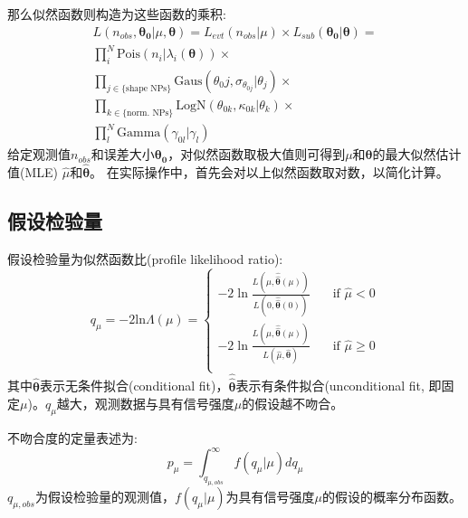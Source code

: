 那么似然函数则构造为这些函数的乘积:
\begin{equation}
\begin{aligned}
 L(n_{obs},\boldsymbol{\theta_0}|\mu,\boldsymbol{\theta})=L_{evt}(n_{obs}|\mu)\times L_{sub}(\boldsymbol{\theta_0}|\boldsymbol{\theta})=\\
 \prod_i^N\text{Pois}(n_i|\lambda_i(\boldsymbol{\theta}))\times \\
 \prod_{j\in\{\text{shape NPs}\}}\text{Gaus}(\theta_0j,\sigma_{\theta_{0j}}|\theta_j)\times \\
 \prod_{k\in\{\text{norm. NPs}\}}\text{LogN}(\theta_{0k},\kappa_{0k}|\theta_k)\times \\
 \prod_l^N\text{Gamma}(\gamma_{0l}|\gamma_l)
\end{aligned}
\end{equation}
给定观测值$n_{obs}$和误差大小$\boldsymbol{\theta_0}$，对似然函数取极大值则可得到$\mu$和$\boldsymbol{\theta}$的最大似然估计值(MLE) $\hat{\mu}$和$\hat{\boldsymbol{\theta}}$。
在实际操作中，首先会对以上似然函数取对数，以简化计算。

\subsection{假设检验量}
假设检验量为似然函数比(profile likelihood ratio):
\begin{equation}
\label{eq:test_statistic}
 q_\mu = -2\text{ln}\Lambda(\mu)=
  \begin{cases}
    -2 \ln \frac{L(\mu,\hat{\hat{\boldsymbol{\theta}}}(\mu))}{L(0,\hat{\hat{\boldsymbol{\theta}}}(0))} & \quad \text{if $\hat\mu < 0$}\\
    -2 \ln \frac{L(\mu,\hat{\hat{\boldsymbol{\theta}}}(\mu))}{L(\hat{\mu},\hat{\boldsymbol{\theta}})} & \quad \text{if $\hat\mu \geq 0$}\\
  \end{cases}
 \end{equation}
 \noindent 其中$\hat{\boldsymbol{\theta}}$表示无条件拟合(conditional fit)，$\hat{\hat{\boldsymbol{\theta}}}$表示有条件拟合(unconditional fit, 即固定$\mu$)。$q_ \mu$越大，观测数据与具有信号强度$\mu$的假设越不吻合。
 
 不吻合度的定量表述为:
 \begin{equation}
  p_ \mu=\int_{q_{\mu, obs}}^{\infty}f(q_ \mu|\mu)dq_ \mu
 \end{equation}
 $q_{\mu, obs}$为假设检验量的观测值，$f(q_ \mu|\mu)$为具有信号强度$\mu$的假设的概率分布函数。
 
